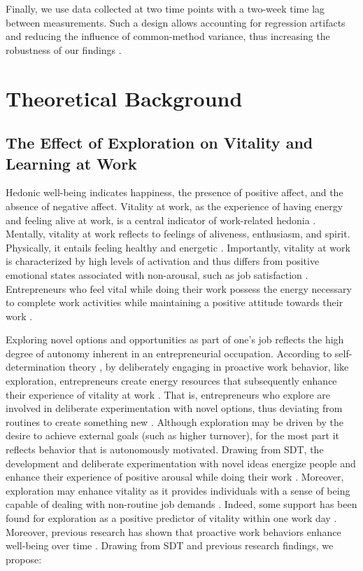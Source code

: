 \documentclass[man]{apa7}
\begin{document}
Finally, we use data collected at two time points with a two-week time lag between measurements. 
Such a design allows accounting for regression artifacts \parencite[e.g.,][]{Campbell1999} and reducing the influence of common-method variance, thus increasing the robustness of our findings \parencite{Podsakoff2003}.

\section{Theoretical Background}

\subsection{The Effect of Exploration on Vitality and Learning at Work}

Hedonic well-being indicates happiness, the presence of positive affect, and the absence of negative affect. 
Vitality at work, as the experience of having energy and feeling alive at work, is a central indicator of work-related hedonia \parencite{Spreitzer.2005b, Nix.1999b}.
Mentally, vitality at work reflects to feelings of aliveness, enthusiasm, and spirit. 
Physically, it entails feeling healthy and energetic \parencite{Ryan.1997, Kark.2009}. 
Importantly, vitality at work is characterized by high levels of activation and thus differs from  positive emotional states associated with non-arousal, such as job satisfaction \parencite{Kark.2009}. 
Entrepreneurs who feel vital while doing their work possess the energy necessary to complete work activities while maintaining a positive attitude towards their work \parencite{Ryan.1997}. \par 

Exploring novel options and opportunities as part of one's job reflects the high degree of autonomy inherent in an entrepreneurial occupation.
According to self-determination theory \parencite[SDT;][]{Ryan2001}, by deliberately engaging in proactive work behavior, like exploration, entrepreneurs create energy resources that subsequently enhance their experience of vitality at work \parencite{Spreitzer.2005b}.
That is, entrepreneurs who explore are involved in deliberate experimentation with novel options, thus deviating from routines to create something new \parencite{Rosing.2017}.
Although exploration may be driven by the desire to achieve external goals (such as higher turnover), for the most part it reflects behavior that is autonomously motivated.
Drawing from SDT, the development and deliberate experimentation with novel ideas energize people and enhance their experience of positive arousal while doing their work \parencite{Spreitzer.2005b}.
Moreover, exploration may enhance vitality as it provides individuals with a sense of being capable of dealing with non-routine job demands \parencite{Daniels2009, Niessen.2012}.
Indeed, some support has been found for exploration as a positive predictor of vitality within one work day \textcite{Niessen.2012}.
Moreover, previous research has shown that proactive work behaviors enhance well-being over time \parencite[e.g.,][]{Seibert.2001, Tims2013}. 
Drawing from SDT and previous research findings, we propose: \par 
\end{document}
